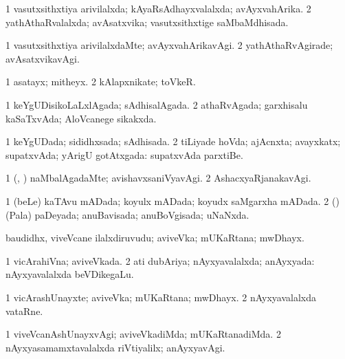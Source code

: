 \bentry
{} 
\gl{\gu}
\expl{}
\bmng
\bnum
\num{1} vasutxsithxtiya arivilalxda; kAyaRsAdhayxvalalxda; avAyxvahArika. 
\num{2} yathAthaRvalalxda; avAsatxvika; vasutxsithxtige saMbaMdhisada. 
\enum
\emng
\eentry

\bentry
{} 
\gl{\kirxvi}
\expl{}
\bmng
\bnum
\num{1} vasutxsithxtiya arivilalxdaMte; avAyxvahArikavAgi. 
\num{2} yathAthaRvAgirade; avAsatxvikavAgi. 
\enum
\emng
\eentry

\bentry
{} 
\gl{\nA}
\expl{}
\bmng
\bnum
\num{1} asatayx; mitheyx. 
\num{2} kAlapxnikate; toVkeR. 
\enum
\emng
\eentry

\bentry
{} 
\gl{\gu}
\expl{}
\bmng
\bnum
\num{1} keYgUDisikoLaLxlAgada; sAdhisalAgada. 
\num{2} athaRvAgada; garxhisalu kaSaTxvAda; AloVcanege sikakxda. 
\enum
\emng
\eentry

\bentry
{} 
\gl{\gu}
\expl{}
\bmng
\bnum
\num{1} keYgUDada; sididhxsada; sAdhisada. 
\num{2} tiLiyade hoVda; ajAcnxta; avayxkatx; supatxvAda; yArigU gotAtxgada:  supatxvAda parxtiBe. 
\enum
\emng
\eentry

\bentry
{} 
\gl{\kirxvi}
\expl{}
\bmng
\bnum
\num{1} (\ame, \ashi) naMbalAgadaMte; avishavxsaniVyavAgi. 
\num{2} AshacxyaRjanakavAgi. 
\enum
\emng
\eentry

\bentry
{} 
\gl{\gu}
\expl{}
\bmng
\bnum
\num{1} (beLe) kaTAvu mADada; koyulx mADada; koyudx saMgarxha mADada. 
\num{2} (\rUpa) (Pala) paDeyada; anuBavisada; anuBoVgisada; uNaNxda. 
\enum
\emng
\eentry

\bentry
{} 
\gl{\nA}
\expl{}
\bmng
baudidhx, viveVcane ilalxdiruvudu; aviveVka; mUKaRtana; mwDhayx. 
\emng
\eentry

\bentry
{} 
\gl{\gu}
\expl{}
\bmng
\bnum
\num{1} vicArahiVna; aviveVkada. 
\num{2} ati dubAriya; nAyxyavalalxda; anAyxyada:  nAyxyavalalxda beVDikegaLu. 
\enum
\emng
\eentry

\bentry
{} 
\gl{\nA}
\expl{}
\bmng
\bnum
\num{1} vicArashUnayxte; aviveVka; mUKaRtana; mwDhayx. 
\num{2} nAyxyavalalxda vataRne. 
\enum
\emng
\eentry

\bentry
{} 
\gl{\kirxvi}
\expl{}
\bmng
\bnum
\num{1} viveVcanAshUnayxvAgi; aviveVkadiMda; mUKaRtanadiMda. 
\num{2} nAyxyasamamxtavalalxda riVtiyalilx; anAyxyavAgi. 
\enum
\emng
\eentry

